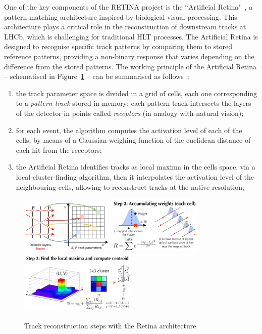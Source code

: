One of the key components of the RETINA project is the ``Artificial Retina"~\cite{Ristori:2000vg}, a pattern-matching architecture inspired by biological visual processing. This architecture plays a critical role in the reconstruction of downstream tracks at LHCb, which is challenging 
for traditional HLT processes. The Artificial Retina is designed to recognise specific track patterns by comparing them to stored reference patterns, providing a non-binary response that varies depending on the difference from the stored patterns. The working principle of the Artificial Retina -- schematised in Figure~\ref{fig:retina_algo} -- can be summarised as follows~\cite{Ristori:2000vg,Lazzari:2801062, Morello:2888549}:
\begin{enumerate}
\item  the track parameter space is divided in a grid of cells, each one corresponding to a \textit{pattern-track} stored in memory: each pattern-track intersects the layers of the detector in points called \textit{receptors} (in analogy with natural vision);
\item  for each event, the algorithm computes the activation level of each of the cells, by means of a Gaussian weighing function of the euclidean distance of each hit from the receptors;
\item the Artificial Retina identifies tracks as local maxima in the cells space, via a local cluster-finding algorithm, then it interpolates the activation level of the neighbouring cells, allowing to reconstruct tracks at the native resolution;
\end{enumerate}
\begin{figure}
    \centering
    \includegraphics[width=0.4\textwidth]{figures/retina-mapping.png}\hfill
    \includegraphics[width=0.4\textwidth]{figures/retina_algo_step2.png}
    \includegraphics[width=0.5\textwidth]{figures/retina_algo_step3.png}
    \caption{Track reconstruction steps with the Retina architecture}
    \label{fig:retina_algo}
\end{figure}
